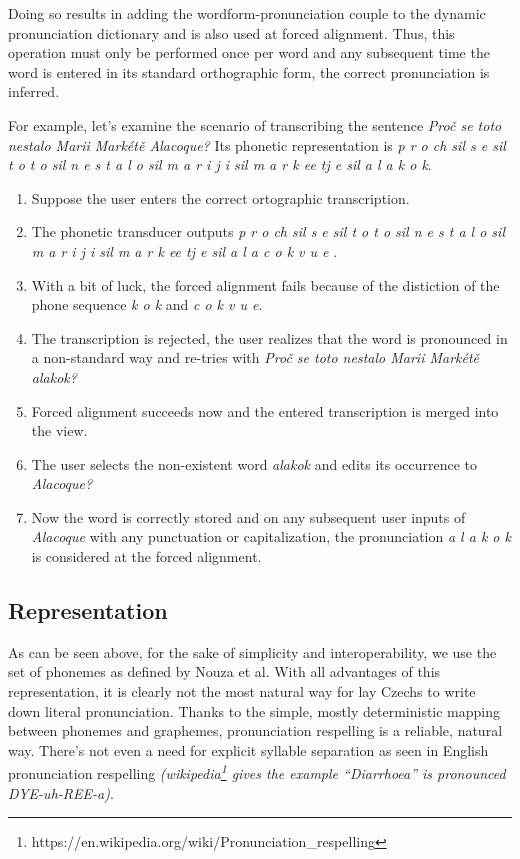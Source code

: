 \documentclass{itatnew}
\begin{document}
Doing so results in adding the wordform-pronunciation couple to the dynamic
pronunciation dictionary and is also used at forced alignment. Thus, this
operation must only be performed once per word and any subsequent time the word
is entered in its standard orthographic form, the correct pronunciation is
inferred.

For example, let's examine the scenario of transcribing the sentence {\em Proč
se toto nestalo Marii Markétě Alacoque?} Its phonetic representation is {\em p r
o ch sil s e sil t o t o sil n e s t a l o sil m a r i j i sil m a r k ee tj e
sil a l a k o k}.
\begin{enumerate}
\item{Suppose the user enters the correct ortographic transcription.}
\item{
    The phonetic transducer outputs {\em
        p r o ch sil
        s e sil
        t o t o sil
        n e s t a l o sil
        m a r i j i sil
        m a r k ee tj e sil
        a l a c o k v u e
    }.
}
\item{
    With a bit of luck, the forced alignment fails because of the distiction of
    the phone sequence {\em k o k} and {\em c o k v u e}.
}
\item{
    The transcription is rejected, the user realizes that the word is pronounced
    in a non-standard way and re-tries with
    {\em Proč se toto nestalo Marii Markétě alakok?}
}
\item{
    Forced alignment succeeds now and the entered transcription is merged into
    the view.
}
\item{
    The user selects the non-existent word {\em alakok} and edits its occurrence
    to {\em Alacoque?}
}
\item{
    Now the word is correctly stored and on any subsequent user inputs of {\em
    Alacoque} with any punctuation or capitalization, the pronunciation
    {\em a l a k o k} is considered at the forced alignment.
}
\end{enumerate}

\subsection{Representation}

As can be seen above, for the sake of simplicity and interoperability, we use
the set of phonemes as defined by Nouza et al.\cite{nouza1997phonetic} With all
advantages of this representation, it is clearly not the most natural way for
lay Czechs to write down literal pronunciation. Thanks to the simple, mostly
deterministic mapping between phonemes and graphemes, pronunciation respelling
is a reliable, natural way. There's not even a need for explicit syllable
separation as seen in English pronunciation respelling {\em
(wikipedia\footnote{https://en.wikipedia.org/wiki/Pronunciation\_respelling}
gives the example {\em ``Diarrhoea'' is pronounced DYE-uh-REE-a})}.
\end{document}
